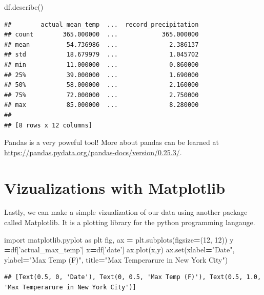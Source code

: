 \documentclass[]{book}
\newenvironment{Shaded}{\begin{snugshade}}{\end{snugshade}}
\newcommand{\DecValTok}[1]{\textcolor[rgb]{0.00,0.00,0.81}{#1}}
\newcommand{\StringTok}[1]{\textcolor[rgb]{0.31,0.60,0.02}{#1}}
\newcommand{\ImportTok}[1]{#1}
\newcommand{\OperatorTok}[1]{\textcolor[rgb]{0.81,0.36,0.00}{\textbf{#1}}}
\newcommand{\BuiltInTok}[1]{#1}
\newcommand{\NormalTok}[1]{#1}
\begin{document}
\begin{Shaded}
\begin{Highlighting}[]
\NormalTok{df.describe()}
\end{Highlighting}
\end{Shaded}

\begin{verbatim}
##        actual_mean_temp  ...  record_precipitation
## count        365.000000  ...            365.000000
## mean          54.736986  ...              2.386137
## std           18.679979  ...              1.045702
## min           11.000000  ...              0.860000
## 25%           39.000000  ...              1.690000
## 50%           58.000000  ...              2.160000
## 75%           72.000000  ...              2.750000
## max           85.000000  ...              8.280000
## 
## [8 rows x 12 columns]
\end{verbatim}

Pandas is a very poweful tool! More about pandas can be learned at
\url{https://pandas.pydata.org/pandas-docs/version/0.25.3/}.

\section{Vizualizations with
Matplotlib}\label{vizualizations-with-matplotlib}

Lastly, we can make a simple vizualization of our data using another
package called Matplotlib. It is a plotting library for the python
programming langauge.

\begin{Shaded}
\begin{Highlighting}[]
\ImportTok{import}\NormalTok{ matplotlib.pyplot }\ImportTok{as}\NormalTok{ plt}
\NormalTok{fig, ax }\OperatorTok{=}\NormalTok{ plt.subplots(figsize}\OperatorTok{=}\NormalTok{(}\DecValTok{12}\NormalTok{, }\DecValTok{12}\NormalTok{))}
\NormalTok{y }\OperatorTok{=}\NormalTok{df[}\StringTok{'actual_max_temp'}\NormalTok{]}
\NormalTok{x}\OperatorTok{=}\NormalTok{df[}\StringTok{'date'}\NormalTok{]}
\NormalTok{ax.plot(x,y)}
\NormalTok{ax.}\BuiltInTok{set}\NormalTok{(xlabel}\OperatorTok{=}\StringTok{"Date"}\NormalTok{, ylabel}\OperatorTok{=}\StringTok{"Max Temp (F)"}\NormalTok{, title}\OperatorTok{=}\StringTok{"Max Temperarure in New York City"}\NormalTok{)}
\end{Highlighting}
\end{Shaded}

\begin{verbatim}
## [Text(0.5, 0, 'Date'), Text(0, 0.5, 'Max Temp (F)'), Text(0.5, 1.0, 'Max Temperarure in New York City')]
\end{verbatim}
\end{document}
